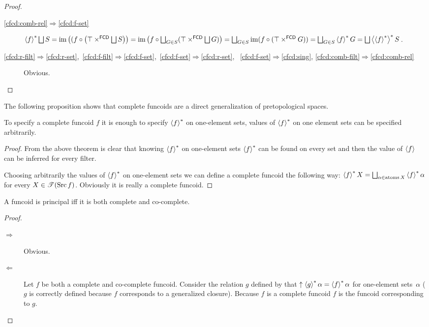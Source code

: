 \begin{proof}
\begin{description}
\item[\ref{cfcd:comb-rel}$\Rightarrow$\ref{cfcd:f-set}]
$\rsupfun{f}\bigsqcup S=\im\left((f\circ\left(\top\times^{\mathsf{FCD}}\bigsqcup S\right)\right)=\im\left(f\circ\bigsqcup_{G\in S}(\top\times^{\mathsf{FCD}}\bigsqcup G)\right)=\bigsqcup_{G\in S}\im(f\circ(\top\times^{\mathsf{FCD}}G))=\bigsqcup_{G\in S}\rsupfun{f}G=\bigsqcup\rsupfun{\rsupfun{f}}S$.

\item
[{\ref{cfcd:r-filt}$\Rightarrow$\ref{cfcd:r-set},~\ref{cfcd:f-filt}$\Rightarrow$\ref{cfcd:f-set},~\ref{cfcd:f-set}$\Rightarrow$\ref{cfcd:r-set},
~\ref{cfcd:f-set}$\Rightarrow$\ref{cfcd:sing}}, \ref{cfcd:comb-filt}$\Rightarrow$\ref{cfcd:comb-rel}] Obvious.
\end{description}
\end{proof}
The following proposition shows that complete funcoids are a direct
generalization of pretopological spaces.
\begin{prop}
To specify a complete funcoid $f$ it is enough to specify $\left\langle f\right\rangle ^{\ast}$
on one-element sets, values of $\left\langle f\right\rangle ^{\ast}$ on one element sets can
be specified arbitrarily.\end{prop}
\begin{proof}
From the above theorem is clear that knowing $\left\langle f\right\rangle ^{\ast}$ on one-element
sets $\left\langle f\right\rangle ^{\ast}$ can be found on every set and then the value of
$\left\langle f\right\rangle$ can be inferred for every filter.

Choosing arbitrarily the values of $\left\langle f\right\rangle ^{\ast}$ on one-element sets
we can define a complete funcoid the following way: $\rsupfun
fX=\bigsqcup_{\alpha\in\atoms X}\rsupfun f\alpha$
for every $X\in\mathscr{T}(\operatorname{Src} f)$. Obviously it is really a complete
funcoid.\end{proof}
\begin{thm}
A funcoid is principal iff it is both complete and co-complete.\end{thm}
\begin{proof}
~
\begin{description}
\item [{$\Rightarrow$}] Obvious.
\item [{$\Leftarrow$}] Let $f$ be both a complete and co-complete funcoid.
Consider the relation $g$ defined by that $\uparrow\left\langle g\right\rangle ^{\ast}\alpha=\left\langle f\right\rangle ^{\ast}\alpha$
for one-element sets~$\alpha$ ($g$ is correctly defined because
$f$ corresponds to a generalized closure). Because $f$ is a complete
funcoid $f$ is the funcoid corresponding to $g$.
\end{description}
\end{proof}
